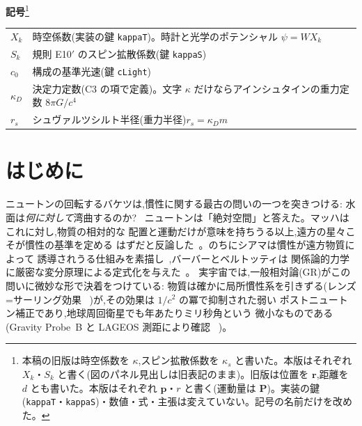 \documentclass[a4paper,10pt,twocolumn]{ltjsarticle}
\newcommand{\vect}[1]{\bm{#1}}
\begin{document}
\noindent\textbf{記号}\footnote{本稿の旧版は時空係数を $\kappa$,スピン拡散係数を $\kappa_s$ と書いた。本版はそれぞれ $X_k$・$S_k$ と書く(図のパネル見出しは旧表記のまま)。旧版は位置を $\vect{r}$,距離を $d$ とも書いた。本版はそれぞれ $\vect{p}$・$r$ と書く(運動量は $\vect{P}$)。実装の鍵(\texttt{kappaT}・\texttt{kappaS})・数値・式・主張は変えていない。記号の名前だけを改めた。}
\begin{center}
\small
\begin{tabular}{@{}lp{}@{}}
\hline
$X_k$ & 時空係数(実装の鍵 \texttt{kappaT})。時計と光学のポテンシャル $\psi = W X_k$ \\
$S_k$ & 規則 E10$'$ のスピン拡散係数(鍵 \texttt{kappaS}) \\
$c_0$ & 構成の基準光速(鍵 \texttt{cLight}) \\
$\kappa_D$ & 決定力定数(C3 の項で定義)。文字 $\kappa$ だけならアインシュタインの重力定数 $8\pi G/c^4$ \\
$r_s$ & シュヴァルツシルト半径(重力半径)$r_s = \kappa_D m$ \\
\hline
\end{tabular}
\end{center}

\section{はじめに}
\label{sec:intro}

ニュートンの回転するバケツは,慣性に関する最古の問いの一つを突きつける:
水面は\emph{何に対して}湾曲するのか?~\cite{Newton1687}
ニュートンは「絶対空間」と答えた。マッハはこれに対し,物質の相対的な
配置と運動だけが意味を持ちうる以上,遠方の星々こそが慣性の基準を定める
はずだと反論した~\cite{Mach1883}。のちにシアマは慣性が遠方物質によって
誘導されうる仕組みを素描し~\cite{Sciama1953},バーバーとベルトッティは
関係論的力学に厳密な変分原理による定式化を与えた~\cite{BarbourBertotti1982}。
実宇宙では,一般相対論(GR)がこの問いに微妙な形で決着をつけている:
物質は確かに局所慣性系を引きずる(レンズ=サーリング効果
~\cite{LenseThirring1918})が,その効果は $1/c^2$ の冪で抑制された弱い
ポストニュートン補正であり,地球周回衛星でも年あたりミリ秒角という
微小なものである(Gravity Probe~B と LAGEOS 測距により確認
~\cite{Everitt2011,CiufoliniPavlis2004})。
\end{document}
